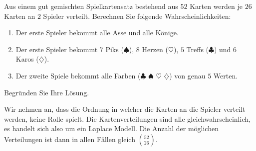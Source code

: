  Aus einem gut gemischten Spielkartensatz
bestehend aus $52$ Karten werden je $26$ Karten an $2$ Spieler verteilt. Berechnen
Sie folgende Wahrscheinlichkeiten:
\begin{enumerate}
    \item Der erste Spieler bekommt alle Asse und alle Könige. 
    \item Der erste Spieler bekommt $7$ Piks ($\spadesuit$), $8$ Herzen
        ($\heartsuit$), $5$ Treffs ($\clubsuit$) und $6$ Karos
        ($\diamondsuit$).
    \item Der zweite Spiele bekommt alle Farben ($\clubsuit$ $\spadesuit$
        $\heartsuit$ $\diamondsuit$) von genau $5$ Werten. 
\end{enumerate}
Begründen Sie Ihre Lösung.

\solution
Wir nehmen an, dass die Ordnung in welcher die Karten an die Spieler verteilt
werden, keine Rolle spielt. Die Kartenverteilungen sind alle
gleichwahrscheinlich, es handelt sich also um ein Laplace Modell. Die Anzahl
der möglichen Verteilungen ist dann in allen Fällen gleich $\binom{52}{26}$. 
